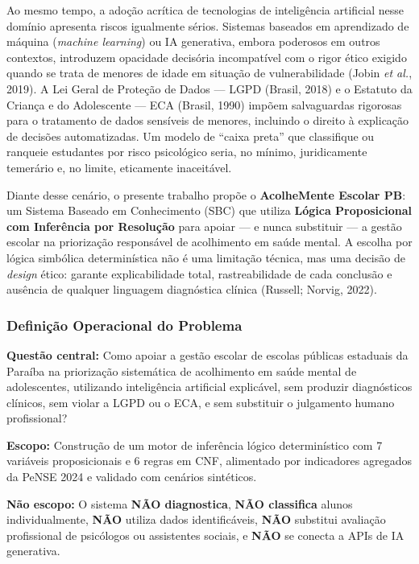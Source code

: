 \documentclass[11pt]{article}
\begin{document}
Ao mesmo tempo, a adoção acrítica de tecnologias de inteligência
artificial nesse domínio apresenta riscos igualmente sérios. Sistemas
baseados em aprendizado de máquina (\emph{machine learning}) ou IA
generativa, embora poderosos em outros contextos, introduzem opacidade
decisória incompatível com o rigor ético exigido quando se trata de
menores de idade em situação de vulnerabilidade (Jobin \emph{et al.},
2019). A Lei Geral de Proteção de Dados --- LGPD (Brasil, 2018) e o
Estatuto da Criança e do Adolescente --- ECA (Brasil, 1990) impõem
salvaguardas rigorosas para o tratamento de dados sensíveis de menores,
incluindo o direito à explicação de decisões automatizadas. Um modelo de
``caixa preta'' que classifique ou ranqueie estudantes por risco
psicológico seria, no mínimo, juridicamente temerário e, no limite,
eticamente inaceitável.

Diante desse cenário, o presente trabalho propõe o \textbf{AcolheMente
Escolar PB}: um Sistema Baseado em Conhecimento (SBC) que utiliza
\textbf{Lógica Proposicional com Inferência por Resolução} para apoiar
--- e nunca substituir --- a gestão escolar na priorização responsável
de acolhimento em saúde mental. A escolha por lógica simbólica
determinística não é uma limitação técnica, mas uma decisão de
\emph{design} ético: garante explicabilidade total, rastreabilidade de
cada conclusão e ausência de qualquer linguagem diagnóstica clínica
(Russell; Norvig, 2022).

\subsubsection{Definição Operacional do
Problema}\label{definiuxe7uxe3o-operacional-do-problema}

\textbf{Questão central:} Como apoiar a gestão escolar de escolas
públicas estaduais da Paraíba na priorização sistemática de acolhimento
em saúde mental de adolescentes, utilizando inteligência artificial
explicável, sem produzir diagnósticos clínicos, sem violar a LGPD ou o
ECA, e sem substituir o julgamento humano profissional?

\textbf{Escopo:} Construção de um motor de inferência lógico
determinístico com 7 variáveis proposicionais e 6 regras em CNF,
alimentado por indicadores agregados da PeNSE 2024 e validado com
cenários sintéticos.

\textbf{Não escopo:} O sistema \textbf{NÃO diagnostica}, \textbf{NÃO
classifica} alunos individualmente, \textbf{NÃO} utiliza dados
identificáveis, \textbf{NÃO} substitui avaliação profissional de
psicólogos ou assistentes sociais, e \textbf{NÃO} se conecta a APIs de
IA generativa.
\end{document}
